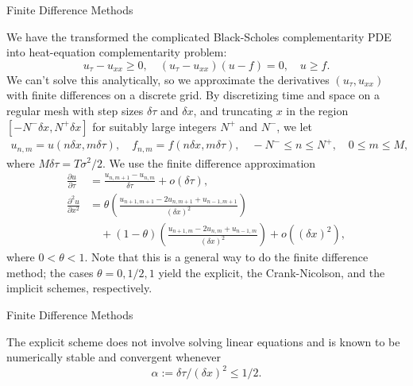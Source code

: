 \documentclass{beamer}
\begin{document}
\begin{frame}{Finite Difference Methods}

    {\footnotesize \footnotesize
    We have the transformed the complicated Black-Scholes complementarity PDE
    into  heat-equation complementarity problem:
    \[
    u_\tau - u_{xx} \geq 0, \quad (u_\tau - u_{xx})(u - f) = 0, \quad u \geq f.
    \]
    We can't solve this analytically,
    so we approximate the derivatives $(u_\tau, u_{xx})$ with finite differences on a discrete grid.
    By discretizing time and space on a regular mesh with step sizes $\delta \tau$ and $\delta x$, 
    and truncating $x$ 
    in the region $[-N^- \delta x, N^+ \delta x]$ for suitably large integers $N^+$ and $N^-$, we let
    \begin{align*}
    u_{n,m} = u(n\delta x, m\delta \tau), \quad f_{n,m} = f(n\delta x, m\delta \tau), \quad
    -N^- \leq n \leq N^+, \quad 0 \leq m \leq M,
    \end{align*}
    where $M\delta \tau = T\sigma^2/2$.
    We use the finite difference approximation
    {\footnotesize \tiny
    \begin{align*}
    \frac{\partial u}{\partial \tau} &= \frac{u_{n,m+1} - u_{n,m}}{\delta \tau} + o(\delta \tau), \\
    \frac{\partial^2 u}{\partial x^2} &= \theta \left( \frac{u_{n+1,m+1} - 2u_{n,m+1} + u_{n-1,m+1}}{(\delta x)^2} \right) \\
    &\quad + (1 - \theta) \left( \frac{u_{n+1,m} - 2u_{n,m} + u_{n-1,m}}{(\delta x)^2} \right) + o((\delta x)^2),
    \end{align*}
    }
    where $0 < \theta < 1$.  Note that this is a general way to do the finite difference method;
     the cases $\theta = 0, 1/2, 1$ yield the explicit, the Crank-Nicolson, and the implicit schemes, respectively.
        }
    
    
\end{frame}

\begin{frame}{Finite Difference Methods}

    {\footnotesize \footnotesize
    The explicit scheme does not involve solving linear equations and is known
    to be numerically stable and convergent whenever
    \[
\alpha := \delta \tau / (\delta x)^2 \leq 1/2.
\]
    }
    
    
\end{frame}


    
\end{document}
